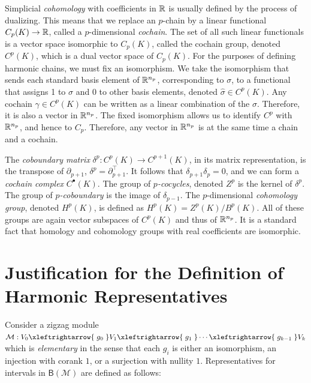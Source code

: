 \documentclass[10pt,a4paper]{amsart}
\newcommand {\mm}[1] {\ifmmode{#1}\else{\mbox{\(#1\)}}\fi}
\newcommand{\Rspace}        {\mm{\mathbb{R}}}
\theoremstyle{definition}
\newcommand{\lrarrowsp}[1]{\xleftrightarrow{\lbarrowspace#1\lbarrowspace}}
\newcommand{\Mcal}{\mathcal{M}}
\newcommand{\barc}{\mathsf{B}}
\newcommand{\lbarrowspace}{\;}
\theoremstyle{remark}
\begin{document}
Simplicial \textit{cohomology} with coefficients in $\Rspace$ is usually  defined by the process of dualizing. This means that we replace an $p$-chain by a linear functional $C_p(K) \rightarrow \Rspace$, called a $p$-dimensional \textit{cochain}. 
The set of all such linear functionals is a vector space isomorphic to $C_p(K)$, called the cochain group, denoted $C^p(K)$, which is a dual vector space of $C_p(K)$.  
For the purposes of defining harmonic chains, we must fix an isomorphism. 
We take the isomorphism that sends each standard basis element of $\Rspace^{n_p}$, corresponding to $\sigma$, to a functional that assigns 1 to $\sigma$ and 0 to other basis elements, denoted $\hat{\sigma} \in C^p(K)$. Any cochain $\gamma \in C^p(K)$ can be written as a linear combination of the $\hat{\sigma}$. Therefore, it is also a vector in $\Rspace^{n_p}$. The fixed isomorphism allows us to identify $C^p$ with $\Rspace^{n_p}$, and hence to $C_p$. Therefore, any vector in $\Rspace^{n_p}$ is at the same time a chain and a cochain.

The \textit{coboundary matrix} $\delta^p: C^p(K)\rightarrow C^{p+1}(K)$, in its matrix representation, is the transpose of $\partial_{p+1}$, $\delta^p = \partial_{p+1}^\top$. It follows that $\delta_{p+1}\delta_p=0$, and we can form a \textit{cochain complex} $C^{\bullet}(K)$. The group of \textit{$p$-cocycles}, denoted $Z^p$ is the kernel of $\delta^p$. The group of \textit{$p$-coboundary} is the image of $\delta_{p-1}$. The $p$-dimensional \textit{cohomology group}, denoted $H^p(K)$, is defined as $H^p(K) = Z^p(K)/B^p(K)$. All of these groups are again vector subspaces of $C^p(K)$ and thus of $\Rspace^{n_p}$.
It is a standard fact that homology and cohomology groups with real coefficients are isomorphic.
\newcommand{\img}{\mathrm{img}}

\section{Justification for the Definition of Harmonic Representatives}\label{sec:rep-just}

Consider a zigzag module $\Mcal:V_0\lrarrowsp{g_0}V_1\lrarrowsp{g_1}\cdots\lrarrowsp{g_{k-1}}V_k$
which is \emph{elementary} in the sense that each $g_i$
is either an isomorphism, an injection with corank $1$,
or a surjection with nullity $1$.
Representatives for intervals in $\barc(\Mcal)$
are defined as follows:
\end{document}
